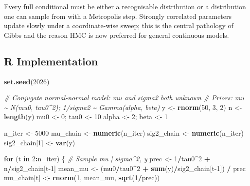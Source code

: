 \documentclass[
]{article}
\newenvironment{Shaded}{\begin{snugshade}}{\end{snugshade}}
\newcommand{\CommentTok}[1]{\textcolor[rgb]{0.56,0.35,0.01}{\textit{#1}}}
\newcommand{\ControlFlowTok}[1]{\textcolor[rgb]{0.13,0.29,0.53}{\textbf{#1}}}
\newcommand{\DecValTok}[1]{\textcolor[rgb]{0.00,0.00,0.81}{#1}}
\newcommand{\FunctionTok}[1]{\textcolor[rgb]{0.13,0.29,0.53}{\textbf{#1}}}
\newcommand{\NormalTok}[1]{#1}
\newcommand{\OtherTok}[1]{\textcolor[rgb]{0.56,0.35,0.01}{#1}}
\newcommand{\SpecialCharTok}[1]{\textcolor[rgb]{0.81,0.36,0.00}{\textbf{#1}}}
\begin{document}
Every full conditional must be either a recognisable distribution or a
distribution one can sample from with a Metropolis step. Strongly
correlated parameters update slowly under a coordinate-wise sweep; this
is the central pathology of Gibbs and the reason HMC is now preferred
for general continuous models.

\subsection{R Implementation}\label{r-implementation}

\begin{Shaded}
\begin{Highlighting}[]
\FunctionTok{set.seed}\NormalTok{(}\DecValTok{2026}\NormalTok{)}

\CommentTok{\# Conjugate normal{-}normal model: mu and sigma2 both unknown}
\CommentTok{\# Priors: mu \textasciitilde{} N(mu0, tau0\^{}2); 1/sigma2 \textasciitilde{} Gamma(alpha, beta)}
\NormalTok{y }\OtherTok{\textless{}{-}} \FunctionTok{rnorm}\NormalTok{(}\DecValTok{50}\NormalTok{, }\DecValTok{3}\NormalTok{, }\DecValTok{2}\NormalTok{)}
\NormalTok{n }\OtherTok{\textless{}{-}} \FunctionTok{length}\NormalTok{(y)}
\NormalTok{mu0 }\OtherTok{\textless{}{-}} \DecValTok{0}\NormalTok{; tau0 }\OtherTok{\textless{}{-}} \DecValTok{10}
\NormalTok{alpha }\OtherTok{\textless{}{-}} \DecValTok{2}\NormalTok{; beta }\OtherTok{\textless{}{-}} \DecValTok{1}

\NormalTok{n\_iter }\OtherTok{\textless{}{-}} \DecValTok{5000}
\NormalTok{mu\_chain    }\OtherTok{\textless{}{-}} \FunctionTok{numeric}\NormalTok{(n\_iter)}
\NormalTok{sig2\_chain  }\OtherTok{\textless{}{-}} \FunctionTok{numeric}\NormalTok{(n\_iter)}
\NormalTok{sig2\_chain[}\DecValTok{1}\NormalTok{] }\OtherTok{\textless{}{-}} \FunctionTok{var}\NormalTok{(y)}

\ControlFlowTok{for}\NormalTok{ (t }\ControlFlowTok{in} \DecValTok{2}\SpecialCharTok{:}\NormalTok{n\_iter) \{}
  \CommentTok{\# Sample mu | sigma\^{}2, y}
\NormalTok{  prec }\OtherTok{\textless{}{-}} \DecValTok{1}\SpecialCharTok{/}\NormalTok{tau0}\SpecialCharTok{\^{}}\DecValTok{2} \SpecialCharTok{+}\NormalTok{ n}\SpecialCharTok{/}\NormalTok{sig2\_chain[t}\DecValTok{{-}1}\NormalTok{]}
\NormalTok{  mean\_mu }\OtherTok{\textless{}{-}}\NormalTok{ (mu0}\SpecialCharTok{/}\NormalTok{tau0}\SpecialCharTok{\^{}}\DecValTok{2} \SpecialCharTok{+} \FunctionTok{sum}\NormalTok{(y)}\SpecialCharTok{/}\NormalTok{sig2\_chain[t}\DecValTok{{-}1}\NormalTok{]) }\SpecialCharTok{/}\NormalTok{ prec}
\NormalTok{  mu\_chain[t] }\OtherTok{\textless{}{-}} \FunctionTok{rnorm}\NormalTok{(}\DecValTok{1}\NormalTok{, mean\_mu, }\FunctionTok{sqrt}\NormalTok{(}\DecValTok{1}\SpecialCharTok{/}\NormalTok{prec))}


\end{Highlighting}
\end{Shaded}
\end{document}
